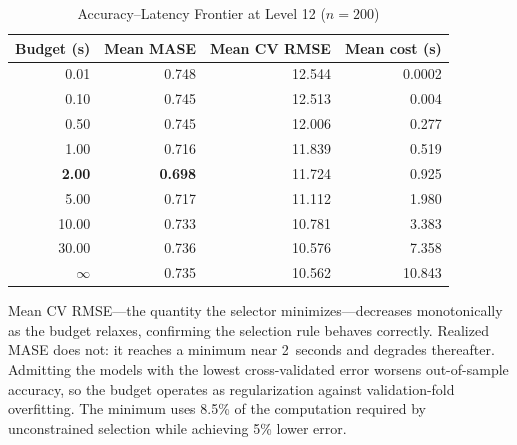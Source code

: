 \begin{table}[!t]
\caption{Accuracy--Latency Frontier at Level 12 ($n{=}200$)}
\label{tab:frontier}
\centering
\begin{tabular}{@{}rrrr@{}}
\toprule
\textbf{Budget (s)} & \textbf{Mean MASE} & \textbf{Mean CV RMSE} & \textbf{Mean cost (s)} \\
\midrule
0.01      & 0.748 & 12.544 & 0.0002 \\
0.10      & 0.745 & 12.513 & 0.004 \\
0.50      & 0.745 & 12.006 & 0.277 \\
1.00      & 0.716 & 11.839 & 0.519 \\
\textbf{2.00} & \textbf{0.698} & 11.724 & 0.925 \\
5.00      & 0.717 & 11.112 & 1.980 \\
10.00     & 0.733 & 10.781 & 3.383 \\
30.00     & 0.736 & 10.576 & 7.358 \\
$\infty$  & 0.735 & 10.562 & 10.843 \\
\bottomrule
\end{tabular}
\vspace{2pt}
\begin{minipage}{\columnwidth}
\footnotesize
Mean CV RMSE---the quantity the selector minimizes---decreases monotonically as
the budget relaxes, confirming the selection rule behaves correctly. Realized
MASE does not: it reaches a minimum near 2~seconds and degrades thereafter.
Admitting the models with the lowest cross-validated error worsens out-of-sample
accuracy, so the budget operates as regularization against validation-fold
overfitting. The minimum uses 8.5\% of the computation required by unconstrained
selection while achieving 5\% lower error.
\end{minipage}
\end{table}
